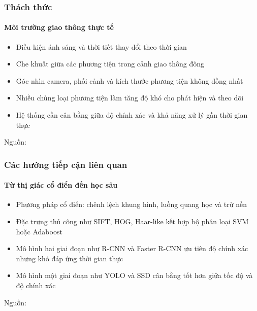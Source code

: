 \begin{frame}
\frametitle{Thách thức}
\framesubtitle{Môi trường giao thông thực tế}

\begin{itemize}[<+->]
  \item Điều kiện ánh sáng và thời tiết thay đổi theo thời gian
  \item Che khuất giữa các phương tiện trong cảnh giao thông đông
  \item Góc nhìn camera, phối cảnh và kích thước phương tiện không đồng nhất
  \item Nhiều chủng loại phương tiện làm tăng độ khó cho phát hiện và theo dõi
  \item Hệ thống cần cân bằng giữa độ chính xác và khả năng xử lý gần thời
        gian thực
\end{itemize}

\vspace{0.2cm}

{\scriptsize Nguồn: \cite{YANG2018143,dai2019}}

\end{frame}

\begin{frame}
\frametitle{Các hướng tiếp cận liên quan}
\framesubtitle{Từ thị giác cổ điển đến học sâu}

\begin{itemize}[<+->]
  \item Phương pháp cổ điển: chênh lệch khung hình, luồng quang học và trừ nền
  \item Đặc trưng thủ công như SIFT, HOG, Haar-like kết hợp bộ phân loại SVM
        hoặc Adaboost
  \item Mô hình hai giai đoạn như R-CNN và Faster R-CNN ưu tiên độ chính xác
        nhưng khó đáp ứng thời gian thực
  \item Mô hình một giai đoạn như YOLO và SSD cân bằng tốt hơn giữa tốc độ và
        độ chính xác
\end{itemize}

\vspace{0.2cm}

{\scriptsize Nguồn: \cite{song2019,dai2019,yaseen2024yolov8}}

\end{frame}

